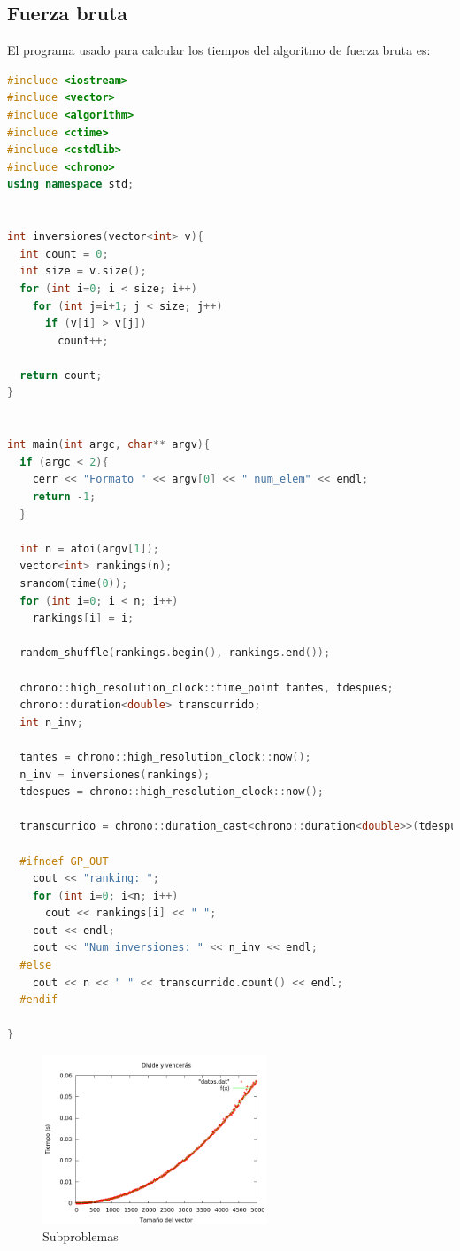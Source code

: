 \subsection{Fuerza bruta}
El programa usado para calcular los tiempos del algoritmo de fuerza bruta es:
\begin{lstlisting}[language=c++]
#include <iostream>
#include <vector>
#include <algorithm>
#include <ctime>
#include <cstdlib>
#include <chrono>
using namespace std;


int inversiones(vector<int> v){
  int count = 0;
  int size = v.size();
  for (int i=0; i < size; i++)
    for (int j=i+1; j < size; j++)
      if (v[i] > v[j])
        count++;

  return count;
}


int main(int argc, char** argv){
  if (argc < 2){
    cerr << "Formato " << argv[0] << " num_elem" << endl;
    return -1;
  }

  int n = atoi(argv[1]);
  vector<int> rankings(n);
  srandom(time(0));
  for (int i=0; i < n; i++)
    rankings[i] = i;

  random_shuffle(rankings.begin(), rankings.end());

  chrono::high_resolution_clock::time_point tantes, tdespues;
  chrono::duration<double> transcurrido;
  int n_inv;

  tantes = chrono::high_resolution_clock::now();
  n_inv = inversiones(rankings);
  tdespues = chrono::high_resolution_clock::now();

  transcurrido = chrono::duration_cast<chrono::duration<double>>(tdespues - tantes);

  #ifndef GP_OUT
    cout << "ranking: ";
    for (int i=0; i<n; i++)
      cout << rankings[i] << " ";
    cout << endl;
    cout << "Num inversiones: " << n_inv << endl;
  #else
    cout << n << " " << transcurrido.count() << endl;
  #endif

}
\end{lstlisting}

\begin{figure}[htb] 
\centering
	\includegraphics[width=0.6\textwidth]{../Opcional/Graficas/dyv_bruno.png}
	\caption{Subproblemas} 
	\label{fig:perros} 
\end{figure}


